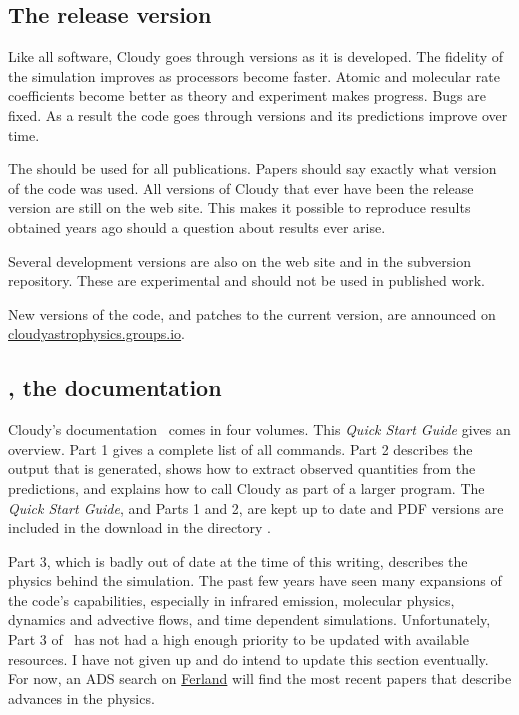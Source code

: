 \documentclass[12pt,twoside]{article}
\begin{document}
{\subsection{The release version}

Like all software, Cloudy goes through versions as it is developed.
The fidelity of the simulation improves as processors become faster.  Atomic
and molecular rate coefficients become better as theory and experiment makes
progress.  Bugs are fixed.
As a result the code goes through versions and its predictions improve over time.

The  should
be used for all publications.  Papers
should say exactly what version of the code was used.
All versions of Cloudy
that ever have been the release version are still on the web site.
This makes it possible to reproduce results obtained years ago should a
question about results ever arise.

Several development versions are also on the web site and in the
subversion repository.  These are experimental and should not be used in
published work.

New versions of the code, and patches to the current version, are
announced on  
\href{https://cloudyastrophysics.groups.io}{cloudyastrophysics.groups.io}.

\subsection{\Hazy, the documentation}

Cloudy's documentation \Hazy\ comes in four volumes.
This \emph{Quick Start Guide} gives an overview.
Part 1 gives a complete list of all commands.
Part 2 describes the output that is generated, shows how to extract
observed quantities from the predictions, and explains how to call Cloudy
as part of a larger program.  
The \emph{Quick Start Guide}, and Parts 1 and 2, are kept up to date and PDF versions are included
in the download in the directory .

Part 3, which is badly out of date at the time of this writing, describes
the physics behind the simulation.  The past few years have seen many
expansions of the code's capabilities, especially in infrared emission,
molecular physics, dynamics and advective flows,
and time dependent simulations.
Unfortunately, Part 3 of \Hazy\ has not had a high enough
priority to be updated with available resources.  I have not given up and
do intend to update this section eventually.  For now, an ADS search on
\href{http://adsabs.harvard.edu/cgi-bin/abs_connect?author=ferland\%2C+g&amp;return_req=no_params}{Ferland} will find the most recent papers that describe advances in the
physics.

}
\end{document}

